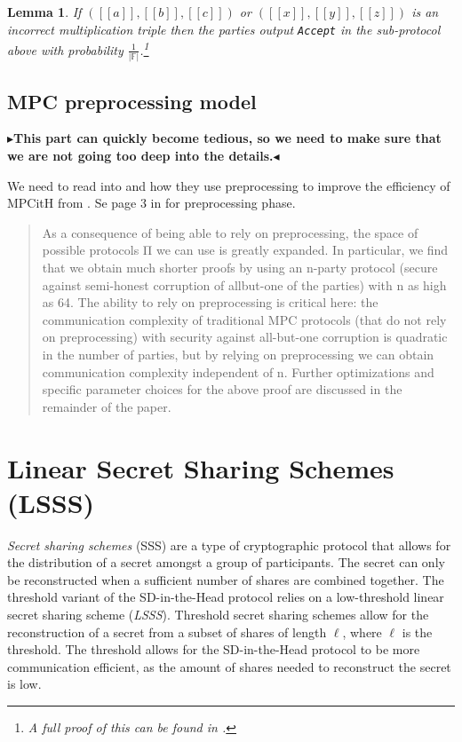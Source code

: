 \documentclass[twoside,11pt,openright]{report}
\theoremstyle{definition}
\theoremstyle{plain}
\newtheorem{lemma}{Lemma}[section]
\newcommand{\todo}[1]{{\color[rgb]{.5,0,0}\textbf{$\blacktriangleright$#1$\blacktriangleleft$}}}
\begin{document}
\begin{lemma}
  If $([[a]], [[b]], [[c]])$ or $([[x]], [[y]], [[z]])$ is an incorrect multiplication triple then the parties output \texttt{Accept} in the sub-protocol above with probability $\frac{1}{|\mathbb{F}|}$.\footnote{A full proof of this can be found in \cite{baum2020concretely}.}
\end{lemma}

\subsection{MPC preprocessing model}

\todo{This part can quickly become tedious, so we need to make sure that we are not going too deep into the details.}

We need to read into \cite{katz2018improved} and how they use preprocessing to improve the efficiency of MPCitH from \cite{ishai2007zero}. Se page 3 in \cite{katz2018improved} for preprocessing phase.

\begin{quote}
  As a consequence of being able to rely on preprocessing, the
  space of possible protocols Π we can use is greatly expanded. In
  particular, we find that we obtain much shorter proofs by using
  an n-party protocol (secure against semi-honest corruption of allbut-one of the parties) with n as high as 64. The ability to rely
  on preprocessing is critical here: the communication complexity
  of traditional MPC protocols (that do not rely on preprocessing)
  with security against all-but-one corruption is quadratic in the
  number of parties, but by relying on preprocessing we can obtain
  communication complexity independent of n.
  Further optimizations and specific parameter choices for the
  above proof are discussed in the remainder of the paper.
\end{quote}

\section{Linear Secret Sharing Schemes (LSSS)}\label{sec:lsss}

\textit{Secret sharing schemes} (SSS) are a type of cryptographic protocol that allows for the distribution of a secret amongst a group of participants. The secret can only be reconstructed when a sufficient number of shares are combined together. The threshold variant of the SD-in-the-Head protocol relies on a low-threshold linear secret sharing scheme (\textit{LSSS}). Threshold secret sharing schemes allow for the reconstruction of a secret from a subset of shares of length $\ell$, where $\ell$ is the threshold. The threshold allows for the SD-in-the-Head protocol to be more communication efficient, as the amount of shares needed to reconstruct the secret is low.
\end{document}
